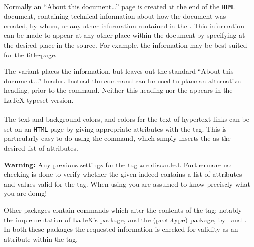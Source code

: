 \paragraph*{\label{htmlinfo}}
\begin{changebar}
Normally an ``About this document...'' page is created at the end
of the \texttt{HTML} document, containing technical information
about how the document was created, by whom, or any other information
contained in the  .
This information can be made to appear at any other place within the document 
by specifying  at the desired place in the source.
For example, the information may be best suited for the title-page.

The variant  places the information, but leaves out the 
standard ``About this document...'' header. 
Instead the  command 
can be used to place an alternative heading, prior to the  command.
Neither this heading nor the   appears 
in the \LaTeX{} typeset version.%
\end{changebar}%


%
\paragraph*{\texttt{}\label{bodytext}}
\begin{changebar}
The text and background colors, and colors for the text of hypertext links can
be set on an \texttt{HTML} page by giving appropriate attributes 
with the  tag. This is particularly easy to do
using the  command, 
which simply inserts the  as the desired list of attributes.%

\medskip
{}\html{\\}%
\noindent
\textbf{Warning: }Any previous settings for the  tag
are discarded. Furthermore no checking is done to verify whether the given 
indeed contains a list of attributes and values valid for the  tag.\html{\\}
When using  you are assumed to know precisely what you are doing!

\medskip\noindent
Other packages contain commands which alter the contents of the  tag;
notably the  implementation of \LaTeX's  package,
and the (prototype)  package, by \Wilck\ and \RossMoore.
In both these packages the requested information is checked for
validity as an attribute within the  tag.
\end{changebar}%

